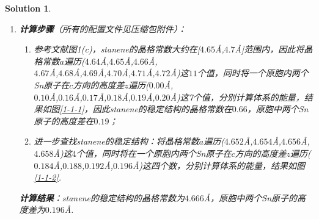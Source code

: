 \documentclass[UTF8,10pt,a4paper]{article}
\theoremstyle{Problem}
\theoremstyle{Solution}
\newtheorem*{sol}{Solution}
\begin{document}
\begin{sol}
    \begin{enumerate}
        \item[1.] \textbf{计算步骤}（所有的配置文件见压缩包附件）：
        \begin{enumerate}
            \item 参考文献图1(c)，stanene的晶格常数大约在[$4.65$\AA,$4.7$\AA]范围内，因此将晶格常数$a$遍历($4.64$\AA,$4.65$\AA,$4.66$\AA,\\$4.67$\AA,$4.68$\AA,$4.69$\AA,$4.70$\AA,$4.71$\AA,$4.72$\AA)这$11$个值，同时将一个原胞内两个Sn原子在$c$方向的高度差$z$遍历($0.00$\AA,\\$0.10$\AA,$0.16$\AA,$0.17$\AA,$0.18$\AA,$0.19$\AA,$0.20$\AA)这7个值，分别计算体系的能量，结果如图\ref{1-1-1}，因此stanene的稳定结构的晶格常数在$0.66$，原胞中两个Sn原子的高度差在$0.19$；
            \item 进一步查找stanene的稳定结构：将晶格常数$a$遍历($4.652$\AA,$4.654$\AA,$4.656$\AA,$4.658$\AA)这$4$个值，同时将在一个原胞内两个Sn原子在$c$方向的高度差$z$遍历($0.184$\AA,$0.188$,$0.192$\AA,$0.196$\AA)这四个数，分别计算体系的能量，结果如图\ref{1-1-2}.
        \end{enumerate}
        \begin{figure}[h]
            \centering
        \end{figure}
        \textbf{计算结果}：stanene的稳定结构的晶格常数为$4.666$\AA，原胞中两个Sn原子的高度差为$0.196$\AA.

\end{enumerate}
\end{sol}
\end{document}
